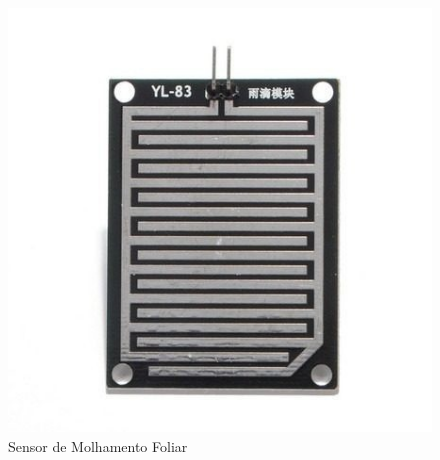 \begin{figure}[H]
\centering
\setlength\lineskip{0pt}
\includegraphics[scale=0.3]{./04-figuras/molhamento.jpg}
\caption{Sensor de Molhamento Foliar}
\vspace{-\baselineskip}
\label{fig:molhamento}
\end{figure}

